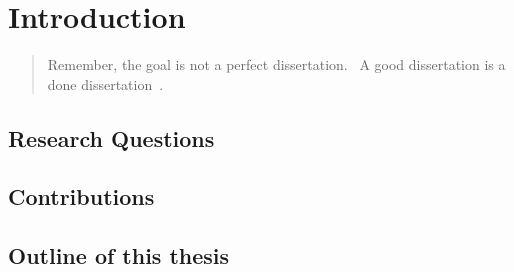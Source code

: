 \documentclass[phd-thesis.tex]{subfiles}
\begin{document}
\chapter{Introduction}
\label{sec:introduction}


\begin{quote}
Remember, the goal is not a perfect dissertation.  A good dissertation
is a done dissertation~\cite{single2010Dissertation}.
\end{quote}

\section{Research Questions}
\label{sec:researchQuestions}



\section{Contributions}
\label{sec:contributions}



\section{Outline of this thesis}
\label{sec:outline}



\ifSubfilesClassLoaded{%
	\printbibliography[category=cited]{}
}{}
\end{document}
